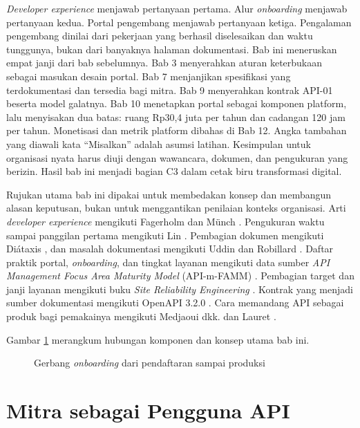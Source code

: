 \textit{Developer experience} menjawab pertanyaan pertama. Alur \textit{onboarding} menjawab pertanyaan kedua. Portal
pengembang menjawab pertanyaan ketiga. Pengalaman pengembang dinilai dari pekerjaan yang berhasil diselesaikan dan waktu
tunggunya, bukan dari banyaknya halaman dokumentasi. Bab ini meneruskan empat janji dari bab sebelumnya. Bab 3
menyerahkan aturan keterbukaan sebagai masukan desain portal. Bab 7 menjanjikan spesifikasi yang terdokumentasi dan
tersedia bagi mitra. Bab 9 menyerahkan kontrak API-01 beserta model galatnya. Bab 10 menetapkan portal sebagai komponen
platform, lalu menyisakan dua batas: ruang Rp30,4 juta per tahun dan cadangan 120 jam per tahun. Monetisasi dan metrik
platform dibahas di Bab 12. Angka tambahan yang diawali kata ``Misalkan'' adalah asumsi latihan. Kesimpulan untuk
organisasi nyata harus diuji dengan wawancara, dokumen, dan pengukuran yang berizin. Hasil bab ini menjadi bagian C3
dalam cetak biru transformasi digital.

Rujukan utama bab ini dipakai untuk membedakan konsep dan membangun alasan keputusan, bukan untuk menggantikan penilaian
konteks organisasi. Arti \textit{developer experience} mengikuti Fagerholm dan Münch \cite{c11-fagerholm2012}. Pengukuran
waktu sampai panggilan pertama mengikuti Lin \cite{c11-lin2021}. Pembagian dokumen mengikuti Diátaxis
\cite{c11-diataxis}, dan masalah dokumentasi mengikuti Uddin dan Robillard \cite{c11-uddin2015}. Daftar praktik portal,
\textit{onboarding}, dan tingkat layanan mengikuti data sumber \textit{API Management Focus Area Maturity Model}
(API-m-FAMM) \cite{mathijssen2020}. Pembagian target dan janji layanan mengikuti buku \textit{Site Reliability
Engineering} \cite{c11-sre-slo}. Kontrak yang menjadi sumber dokumentasi mengikuti OpenAPI 3.2.0 \cite{openapi32}. Cara
memandang API sebagai produk bagi pemakainya mengikuti Medjaoui dkk. \cite{medjaoui2021continuous} dan Lauret
\cite{lauret2025design}.

Gambar \ref{fig:ch11-ilustrasi-bab} merangkum hubungan komponen dan konsep utama bab ini.
\begin{figure}[!htb]
  \centering
  
  \caption{Gerbang \textit{onboarding} dari pendaftaran sampai produksi}
  \label{fig:ch11-ilustrasi-bab}
\end{figure}

\section{Mitra sebagai Pengguna API}

